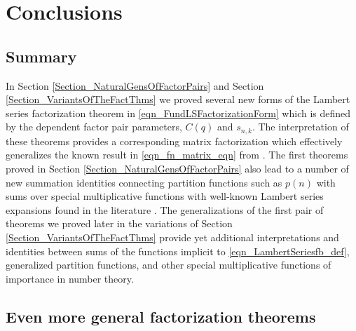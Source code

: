 \documentclass[10pt,reqno]{amsart}
\numberwithin{figure}{section}
\numberwithin{table}{section}
\theoremstyle{plain}
\numberwithin{theorem}{section}
\theoremstyle{remark}
\begin{document}
\section{Conclusions} 
\label{Section_Concl} 

\subsection{Summary} 

In Section \ref{Section_NaturalGensOfFactorPairs} and Section \ref{Section_VariantsOfTheFactThms} 
we proved several new forms of the Lambert 
series factorization theorem in \eqref{eqn_FundLSFactorizationForm} 
which is defined by the dependent factor pair 
parameters, $C(q)$ and $s_{n,k}$. The interpretation of these theorems provides a 
corresponding matrix factorization which effectively generalizes the known result in 
\eqref{eqn_fn_matrix_eqn} from \cite{MERCA-SCHMIDT1,SCHMIDT-LSFACTTHM}. 
The first theorems proved in Section \ref{Section_NaturalGensOfFactorPairs} also lead 
to a number of new summation identities connecting partition functions such as $p(n)$ 
with sums over special multiplicative functions with well-known Lambert series expansions 
found in the literature \cite[{\textit{cf.\ }} \S 1, \S 3]{MERCA-SCHMIDT1}. 
The generalizations of the first pair of theorems we proved later in the 
variations of Section \ref{Section_VariantsOfTheFactThms} 
provide yet additional interpretations and identities between sums of the 
functions implicit to \eqref{eqn_LambertSeriesfb_def}, generalized partition functions, and 
other special multiplicative functions of importance in number theory. 

\subsection{Even more general factorization theorems} 
\end{document}
